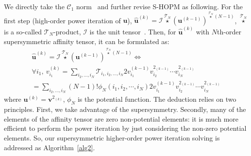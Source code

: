 We directly take the $\mathcal{C}_1$ norm~\cite{Duchenne_etal09} and further revise S-HOPM as following.
For the first step (high-order power iteration of $\boldsymbol{u}$), $\hat{\boldsymbol{u}}^{(k)}=\mathcal{I}\mathop{\star}\limits^{\mathcal{T}_N}
{(\boldsymbol{u}^{(k-1)})}^{\mathop{\star}\limits^{\mathcal{T}_N} (N-1)}$, 
$\mathop{\star}\limits^{\mathcal{T}_N}$ is a so-called $\mathcal{T}_N$-product,
$\mathcal{I}$ is the unit tensor~\cite{Kofidis02}.
Then, for $\hat{\boldsymbol{u}}^{(k)}$ with $N$th-order supersymmetric affinity tensor, it can be formulated as:
\begin{eqnarray}
\label{equ:eqsmain2}
\hat{\boldsymbol{u}}^{(k)}=\mathcal{I}\mathop{\star}\limits^{\mathcal{T}_N}
{(\boldsymbol{u}^{(k-1)})}^{\mathop{\star}\limits^{\mathcal{T}_N} (N-1)} \Leftrightarrow  \nonumber \\
\forall i_1,\ v_{i_1}^{(k)}=\sum\limits_{i_2,\ldots,i_N}\mathcal{T}_{i_1,i_2,\ldots,i_N}2v_{i_1}^{(k-1)}v_{i_2}^{2_{(k-1)}}\cdots v_{i_N}^{2_{(k-1)}} \nonumber \\
                           =\sum\limits_{i_2,\ldots,i_N}(N-1)!\phi_N(i_1,i_2,\cdots , i_N)2v_{i_1}^{(k-1)}v_{i_2}^{2_{(k-1)}}\cdots v_{i_N}^{2_{(k-1)}} 
\end{eqnarray}
where $\boldsymbol{u}^{(k)}=\boldsymbol{v}^{2_{(k)}}$, $\phi_N$ is the potential function.
The deduction relies on two principles. First, we take advantage of the supersymmetry.
Secondly, many of the elements of the affinity tensor are zero non-potential elements:
it is much more efficient to perform the power iteration by just considering the non-zero potential elements.
So, our supersymmetric higher-order power iteration solving is addressed as Algorithm~\ref{alg2}.

